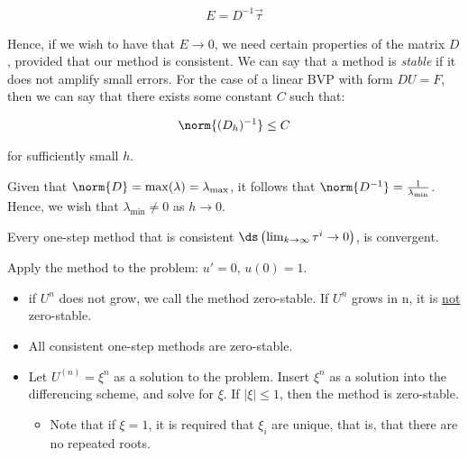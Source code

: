 \documentclass{article}
\begin{document}
\begin{align*}
  E = D^{-1}\vec{\tau}
\end{align*}

Hence, if we wish to have that $E \to 0$, we need certain properties of the matrix $D$, provided that our method is consistent.
\gap
{} We can say that a method is \textit{stable} if it does not amplify small errors. For the case of a linear BVP with form $DU = F$, then we can say that there exists some constant $C$ such that:

\begin{align*}
  \norm{(D_h)^{-1}} \leq C
\end{align*}

for sufficiently small $h$.

Given that $\norm{D} = \max(\lambda) = \lambda_\text{max}$, it follows that $\norm{D^{-1}} = \frac{1}{\lambda_\text{min}}$. Hence, we wish that $\lambda_\text{min} \neq 0$ as $h \to 0$.

 Every one-step method that is consistent $\ds \left(\lim_{k\to \infty} \tau^i \to 0\right)$, is convergent.
\gap
{}

 Apply the method to the problem: $u' = 0$, $u(0) = 1$.
\begin{itemize}
\item {} if $U^n$ does not grow, we call the method zero-stable. If $U^n$ grows in n, it is \underline{not} zero-stable.
\item {} All consistent one-step methods are zero-stable.
\item {} Let $U^{(n)} = \xi^n$ as a solution to the problem. Insert
  $\xi^n$ as a solution into the differencing scheme, and solve for $\xi$. If $|\xi| \leq 1$, then the method is zero-stable.
  \begin{itemize}
  \item Note that if $\xi = 1$, it is required that $\xi_i$ are unique, that is, that there are no repeated roots.
  \end{itemize}
\end{itemize}
\end{document}
